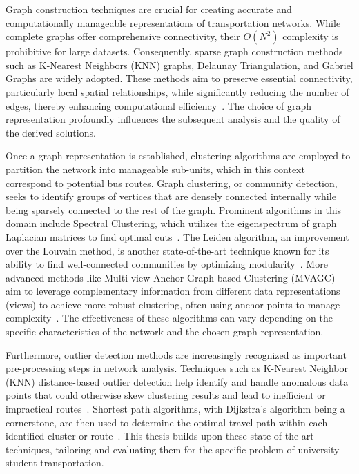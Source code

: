 Graph construction techniques are crucial for creating accurate and computationally manageable representations of transportation networks. While complete graphs offer comprehensive connectivity, their $O(N^2)$ complexity is prohibitive for large datasets. Consequently, sparse graph construction methods such as K-Nearest Neighbors (KNN) graphs, Delaunay Triangulation, and Gabriel Graphs are widely adopted. These methods aim to preserve essential connectivity, particularly local spatial relationships, while significantly reducing the number of edges, thereby enhancing computational efficiency~\cite{ch:basics}. The choice of graph representation profoundly influences the subsequent analysis and the quality of the derived solutions.

Once a graph representation is established, clustering algorithms are employed to partition the network into manageable sub-units, which in this context correspond to potential bus routes. Graph clustering, or community detection, seeks to identify groups of vertices that are densely connected internally while being sparsely connected to the rest of the graph. Prominent algorithms in this domain include Spectral Clustering, which utilizes the eigenspectrum of graph Laplacian matrices to find optimal cuts~\cite{ch:basics}. The Leiden algorithm, an improvement over the Louvain method, is another state-of-the-art technique known for its ability to find well-connected communities by optimizing modularity~\cite{leiden}. More advanced methods like Multi-view Anchor Graph-based Clustering (MVAGC) aim to leverage complementary information from different data representations (views) to achieve more robust clustering, often using anchor points to manage complexity~\cite{ch:basics}. The effectiveness of these algorithms can vary depending on the specific characteristics of the network and the chosen graph representation.

Furthermore, outlier detection methods are increasingly recognized as important pre-processing steps in network analysis. Techniques such as K-Nearest Neighbor (KNN) distance-based outlier detection help identify and handle anomalous data points that could otherwise skew clustering results and lead to inefficient or impractical routes~\cite{knn_outlier}. Shortest path algorithms, with Dijkstra's algorithm being a cornerstone, are then used to determine the optimal travel path within each identified cluster or route~\cite{ch:basics}. This thesis builds upon these state-of-the-art techniques, tailoring and evaluating them for the specific problem of university student transportation.

